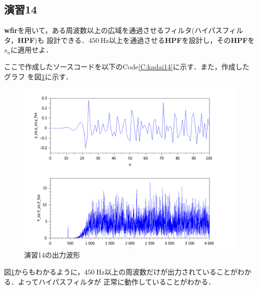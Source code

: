 \documentclass[a4paper,11pt]{jsarticle}
\begin{document}
  \subsection{演習14}
    \begin{screen}
      \textbf{wfir}を用いて，ある周波数以上の広域を通過させるフィルタ(ハイパスフィルタ，\textbf{HPF})も
      設計できる．$\SI{450}{\hertz}$以上を通過させる\textbf{HPF}を設計し，その\textbf{HPF}を$s_n$に適用せよ．
    \end{screen}
    ここで作成したソースコードを以下のCode\ref{C:kadai14}に示す．また，作成したグラフ
  を図\ref{G:kadai14}に示す．
  
  \begin{figure}[H]
    \centering
    \includegraphics[width=0.8\linewidth]{picture/kadai14.png}
    \caption{演習14の出力波形}
    \label{G:kadai14}
  \end{figure}
  図\ref{G:kadai14}からもわかるように，$\SI{450}{\hertz}$以上の周波数だけが出力されていることがわかる．よってハイパスフィルタが
  正常に動作していることがわかる．
\end{document}
